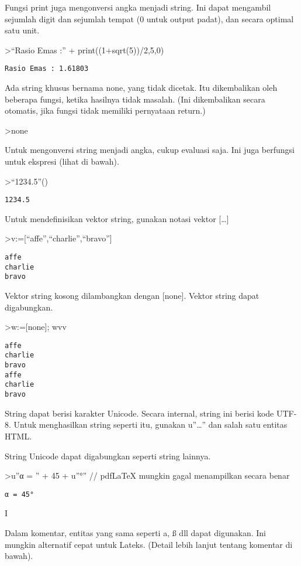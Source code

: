 \documentclass[
]{book}
\begin{document}
Fungsi print juga mengonversi angka menjadi string. Ini dapat mengambil sejumlah digit dan sejumlah tempat (0 untuk output padat), dan secara optimal satu unit.

\textgreater{}``Rasio Emas :'' + print((1+sqrt(5))/2,5,0)

\begin{verbatim}
Rasio Emas : 1.61803
\end{verbatim}

Ada string khusus bernama none, yang tidak dicetak. Itu dikembalikan oleh beberapa fungsi, ketika hasilnya tidak masalah. (Ini dikembalikan secara otomatis, jika fungsi tidak memiliki pernyataan return.)

\textgreater none

Untuk mengonversi string menjadi angka, cukup evaluasi saja. Ini juga berfungsi untuk ekspresi (lihat di bawah).

\textgreater{}``1234.5''()

\begin{verbatim}
1234.5
\end{verbatim}

Untuk mendefinisikan vektor string, gunakan notasi vektor {[}\ldots{]}

\textgreater v:={[}``affe'',``charlie'',``bravo''{]}

\begin{verbatim}
affe
charlie
bravo
\end{verbatim}

Vektor string kosong dilambangkan dengan {[}none{]}. Vektor string dapat digabungkan.

\textgreater w:={[}none{]}; w\textbar v\textbar v

\begin{verbatim}
affe
charlie
bravo
affe
charlie
bravo
\end{verbatim}

String dapat berisi karakter Unicode. Secara internal, string ini berisi kode UTF-8. Untuk menghasilkan string seperti itu, gunakan u''\ldots'' dan salah satu entitas HTML.

String Unicode dapat digabungkan seperti string lainnya.

\textgreater u''α = '' + 45 + u''°'' // pdfLaTeX mungkin gagal menampilkan secara benar

\begin{verbatim}
α = 45°
\end{verbatim}

I

Dalam komentar, entitas yang sama seperti a, ß dll dapat digunakan. Ini mungkin alternatif cepat untuk Lateks. (Detail lebih lanjut tentang komentar di bawah).
\end{document}
